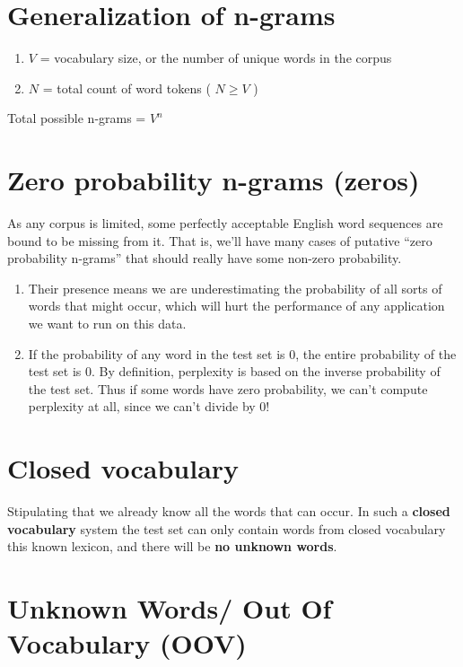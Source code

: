 \section{Generalization of n-grams \cite{nlp-1}}
\begin{enumerate}
    \item $V$ = vocabulary size, or the number of unique words in the corpus
    \item $N$ = total count of word tokens ( $N \geq V$ )
\end{enumerate}

Total possible n-grams = $V^n$

\section{Zero probability n-grams (zeros) \cite{nlp-1}}

As any corpus is limited, some perfectly acceptable English word sequences are bound to be missing from it. That is, we’ll have many cases of putative “zero probability n-grams” that should really have some non-zero probability.

\begin{enumerate}
    \item Their presence means we are underestimating the probability of all sorts of words that might occur, which will hurt the performance of any application we want to run on this data.
    \item If the probability of any word in the test set is 0, the entire probability of the test set is 0. By definition, perplexity is based on the inverse probability of the test set. Thus if some words have zero probability, we can’t compute perplexity at all, since we can’t divide by 0!
\end{enumerate}


\section{Closed vocabulary \cite{nlp-1}}

Stipulating that we already know all the words that can occur. In such a \textbf{closed vocabulary} system the test set can only contain words from closed vocabulary this known lexicon, and there will be \textbf{no unknown words}.


\section{Unknown Words/ Out Of Vocabulary (OOV) \cite{nlp-1}}

